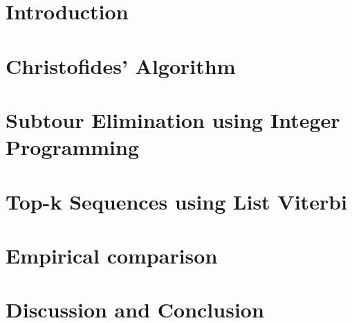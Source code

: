 \documentclass[sigconf]{acmart}
\begin{document}
\section{Introduction}


\section{Christofides' Algorithm}


\section{Subtour Elimination using Integer Programming}


\section{Top-k Sequences using List Viterbi}


%

\section{Empirical comparison}


\section{Discussion and Conclusion}




 
\end{document}
